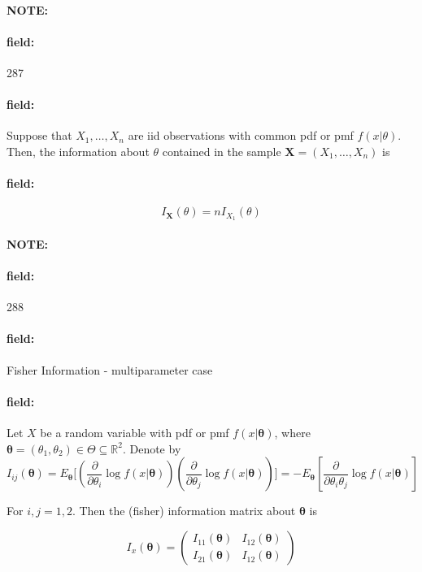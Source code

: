 \documentclass[12pt]{article}
\newenvironment{note}{\paragraph{NOTE:}}{}
\newenvironment{field}{\paragraph{field:}}{}
\begin{document}
\begin{note} \begin{field} \tiny 287 \end{field}
  \begin{field}
    Suppose that $X_1, \ldots , X_n$ are iid observations with common pdf or pmf $f(x|\theta)$. Then, the information about $\theta$ contained in the sample $\mathbf{X} = (X_1, \ldots , X_n)$ is
  \end{field}
  \begin{field}
    $$I_{\mathbf{X}}(\theta) = n I_{X_1}(\theta)$$
  \end{field}
\end{note}

\begin{note} \begin{field} \tiny 288 \end{field}
  \begin{field}
    Fisher Information - multiparameter case
  \end{field}
  \begin{field}
    Let $X$ be a random variable with pdf or pmf $f(x|\boldsymbol\theta)$, where $\boldsymbol\theta = (\theta_1,\theta_2) \in \Theta \subseteq \mathbb{R}^2$. Denote by $$I_{ij}(\boldsymbol\theta) = E_{\boldsymbol\theta}\big[(\frac{\partial}{\partial \theta_i}\log f(x|\boldsymbol\theta))(\frac{\partial}{\partial \theta_j} \log f(x|\boldsymbol\theta))\big] = -E_{\boldsymbol\theta}[\frac{\partial}{\partial \theta_i\theta_j}\log f(x|\boldsymbol\theta)]$$

    For $i,j = 1,2$.
    Then the (fisher) information matrix about $\boldsymbol\theta$ is

    $$ I_x(\boldsymbol\theta) = \begin{pmatrix}
      I_{11}(\boldsymbol\theta) & I_{12}(\boldsymbol\theta)\\
      I_{21}(\boldsymbol\theta) & I_{12}(\boldsymbol\theta)
    \end{pmatrix}$$
  \end{field}
\end{note}
\end{document}
